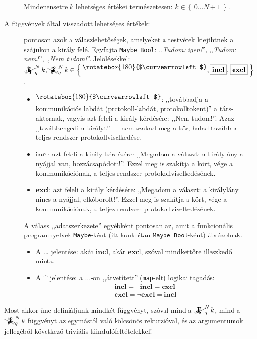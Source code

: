 \documentclass{article}
\newcommand{\nothing}{\text{\raisebox{0.4em}{\rotatebox{180}{$\curvearrowleft$}}}}%
\newcommand{\just}[1]{\boxed{#1}}%
\newcommand{\incl}{\mathbf{incl}}
\newcommand{\excl}{\mathbf{excl}}
\newcommand{\setOf}[1]{\left\lbrace\,#1\,\right\rbrace}
\newcommand{\mainfunA}[3]{\mathwitch_{#2}^{#1}#3}
\newcommand{\mainfunB}[3]{\reversemathwitch_{#2}^{#1}#3}
\begin{document}
\begin{description}
		Mindenensetre $k$ lehetséges értékei természetesen: $k\in\setOf{0\dots N+1}$.

		\item[A függvények által visszadott lehetséges értékek:] pontosan azok a válaszlehetőségek, amelyeket a testvérek kiejthtnek a szájukon a király felé. Egyfajta \texttt{Maybe Bool}: ,,\textit{Tudom: igen!}'', ,,\textit{Tudom: nem!}'', ,,\textit{Nem tudom!}''. Jelölésekkel: $\mainfunA Nqk, \mainfunB Nqk \in \setOf{\nothing, \just\incl, \just\excl}$.
		\begin{itemize}
			\item $\nothing$: ,,továbbadja a kommunikációs labdát (protokoll-labdát, protokolltokent)'' a társ-aktornak, vagyis azt feleli a király kérdésére: ,,Nem tudom!''.  Azaz ,,továbbengedi a királyt'' --- nem szakad meg a kör, halad tovább a teljes rendszer protokollviselkedése.
			\item $\just\incl$: azt feleli a király kérdésére: ,,Megadom a választ:  a királylány a nyájjal van, hozzácsapódott!''. Ezzel meg is szakítja a kört, vége a kommunikációnak, a teljes rendszer protokollviselkedésének.
			\item $\just\excl$: azt feleli a király kérdésére: ,,Megadom a választ:  a királylány nincs a nyájjal, elkóborolt!''. Ezzel meg is szakítja a kört, vége a kommunikációnak, a teljes rendszer protokollviselkedésének.
		\end{itemize}
		A válasz ,,adatszerkezete'' egyébként pontosan az, amit a funkcionális programnyelvek \texttt{Maybe}-ként (itt konkrétan \texttt{Maybe Bool}-ként) ábrázolnak:
		\begin{itemize}
			\item A $\just{\dots}$ jelentése: akár $\just\incl$, akár $\just\excl$, szóval mindkettőre illeszkedő minta.
			\item A $\hat\lnot$ jelentése: a $\just\dots$-on ,,átvetített'' (\texttt{map}-elt) logikai tagadás:
			\begin{align*}
				\mathop{\hat\lnot}\just\incl = \just{\lnot\incl} = \just\excl\\
				\mathop{\hat\lnot}\just\excl = \just{\lnot\excl} = \just\incl
			\end{align*}
		\end{itemize}
	\end{description} 
	
	Most akkor íme definiáljunk mindkét függvényt, szóval mind a $\mainfunA Nqk$, mind a $\mainfunB Nqk$ függvényt az egymástól való kölcsönös rekurzióval, és az argumentumok jellegéből következő triviális kiindulófeltételekkel!
\end{document}
